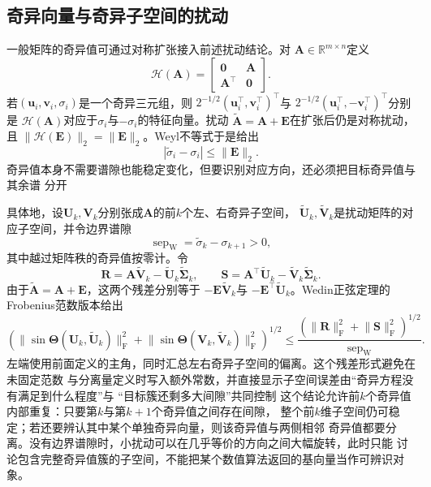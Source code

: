 \subsection{奇异向量与奇异子空间的扰动}

一般矩阵的奇异值可通过对称扩张接入前述扰动结论。对
$\bm{A}\in\mathbb{R}^{m\times n}$定义
\[
  \mathcal{H}(\bm{A})
  =
  \begin{bmatrix}
    \bm{0}&\bm{A}\\
    \bm{A}^{\top}&\bm{0}
  \end{bmatrix}.
\]
若$(\bm{u}_i,\bm{v}_i,\sigma_i)$是一个奇异三元组，则
$2^{-1/2}(\bm{u}_i^{\top},\bm{v}_i^{\top})^{\top}$与
$2^{-1/2}(\bm{u}_i^{\top},-\bm{v}_i^{\top})^{\top}$分别是
$\mathcal{H}(\bm{A})$对应于$\sigma_i$与$-\sigma_i$的特征向量。扰动
$\widetilde{\bm{A}}=\bm{A}+\bm{E}$在扩张后仍是对称扰动，且
$\lVert\mathcal{H}(\bm{E})\rVert_2=\lVert\bm{E}\rVert_2$。Weyl不等式于是给出
\begin{equation}
  |\widetilde{\sigma}_i-\sigma_i|
  \leq\lVert\bm{E}\rVert_2.
  \label{eq:matrix-analysis-singular-value-perturbation}
\end{equation}
奇异值本身不需要谱隙也能稳定变化，但要识别对应方向，还必须把目标奇异值与其余谱
分开

具体地，设$\bm{U}_k,\bm{V}_k$分别张成$\bm{A}$的前$k$个左、右奇异子空间，
$\widetilde{\bm{U}}_k,\widetilde{\bm{V}}_k$是扰动矩阵的对应子空间，并令边界谱隙
\[
  \operatorname{sep}_{\mathrm{W}}
  =\widetilde{\sigma}_k-\sigma_{k+1}>0,
\]
其中越过矩阵秩的奇异值按零计。令
\[
  \bm{R}
  =\bm{A}\widetilde{\bm{V}}_k
   -\widetilde{\bm{U}}_k\widetilde{\bm{\Sigma}}_k,
  \qquad
  \bm{S}
  =\bm{A}^{\top}\widetilde{\bm{U}}_k
   -\widetilde{\bm{V}}_k\widetilde{\bm{\Sigma}}_k.
\]
由于$\widetilde{\bm{A}}=\bm{A}+\bm{E}$，这两个残差分别等于
$-\bm{E}\widetilde{\bm{V}}_k$与
$-\bm{E}^{\top}\widetilde{\bm{U}}_k$。Wedin正弦定理的Frobenius范数版本给出
\begin{equation}
  \left(
    \lVert\sin\bm{\Theta}(\bm{U}_k,\widetilde{\bm{U}}_k)\rVert_{\mathrm{F}}^2
    +
    \lVert\sin\bm{\Theta}(\bm{V}_k,\widetilde{\bm{V}}_k)\rVert_{\mathrm{F}}^2
  \right)^{1/2}
  \leq
  \frac{
    \left(\lVert\bm{R}\rVert_{\mathrm{F}}^2
    +\lVert\bm{S}\rVert_{\mathrm{F}}^2\right)^{1/2}
  }{\operatorname{sep}_{\mathrm{W}}}.
  \label{eq:matrix-analysis-singular-subspace-gap}
\end{equation}
左端使用前面定义的主角，同时汇总左右奇异子空间的偏离。这个残差形式避免在未固定范数
与分离量定义时写入额外常数，并直接显示子空间误差由“奇异方程没有满足到什么程度”与
“目标簇还剩多大间隙”共同控制
这个结论允许前$k$个奇异值内部重复：只要第$k$与第$k+1$个奇异值之间存在间隙，
整个前$k$维子空间仍可稳定；若还要辨认其中某个单独奇异向量，则该奇异值与两侧相邻
奇异值都要分离。没有边界谱隙时，小扰动可以在几乎等价的方向之间大幅旋转，此时只能
讨论包含完整奇异值簇的子空间，不能把某个数值算法返回的基向量当作可辨识对象。

